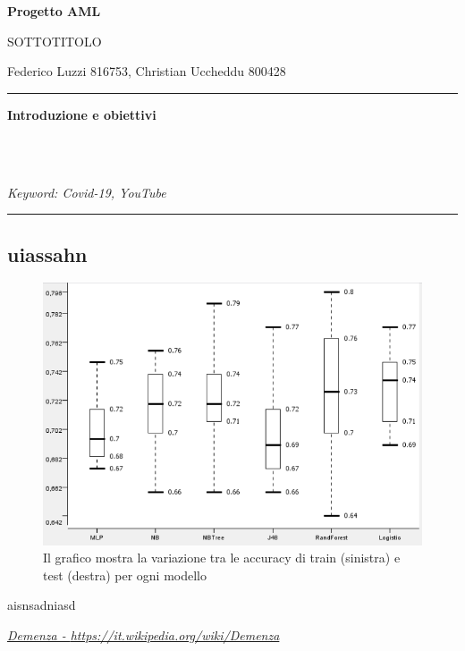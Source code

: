 \documentclass[10pt, a4paper,openany]{article}
\begin{document}
\begin{center}
\huge{\textbf{Progetto AML}}

SOTTOTITOLO
\end{center}

\begin{center}
Federico Luzzi 816753, Christian Uccheddu 800428
\end{center}

\hrule
\vspace{0.2cm}
\begin{center}\textbf{Introduzione e obiettivi}\end{center} 
\blindtext[1]
\\\\ \begin{small}
	\textit{Keyword: Covid-19, YouTube}
\end{small}
\vspace{0.2cm}
\hrule
\vspace{0.2cm}

\begin{multicols}{2}
	\section{uiassahn}
	\blindtext[3]
	\begin{figure}[H]

		\centering

		\includegraphics[height=0.6 \linewidth]{pics/IterHold.png}

		\caption{Il grafico mostra la variazione tra le accuracy di train (sinistra) e test (destra) per ogni modello}

		\label{fig:trainHold}

	\end{figure}
	aisnsadniasd \cite{a:tesi}
\end{multicols}

\newpage
\begin{thebibliography}{1}

	\href{https://it.wikipedia.org/wiki/Demenza}{\emph{Demenza - \url{https://it.wikipedia.org/wiki/Demenza}}}
	
\end{thebibliography}
\end{document}
